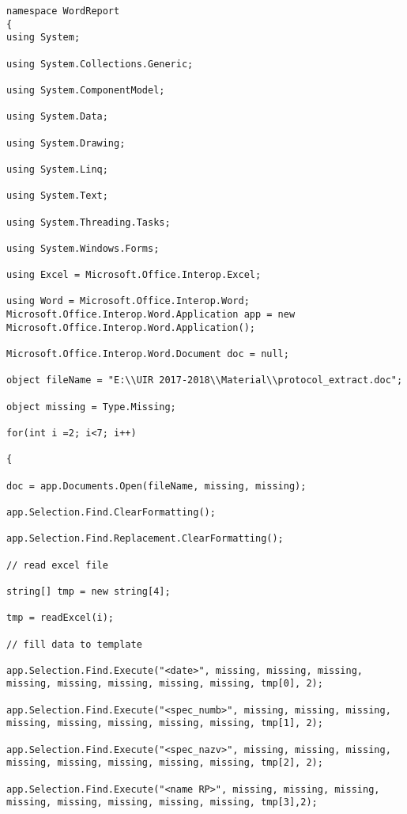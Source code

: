 \begin{lstlisting}
namespace WordReport
{
using System;

using System.Collections.Generic;

using System.ComponentModel;

using System.Data;

using System.Drawing;

using System.Linq;

using System.Text;

using System.Threading.Tasks;

using System.Windows.Forms;

using Excel = Microsoft.Office.Interop.Excel;

using Word = Microsoft.Office.Interop.Word; 
Microsoft.Office.Interop.Word.Application app = new Microsoft.Office.Interop.Word.Application();

Microsoft.Office.Interop.Word.Document doc = null;

object fileName = "E:\\UIR 2017-2018\\Material\\protocol_extract.doc";

object missing = Type.Missing;

for(int i =2; i<7; i++)

{

doc = app.Documents.Open(fileName, missing, missing);

app.Selection.Find.ClearFormatting();

app.Selection.Find.Replacement.ClearFormatting();

// read excel file

string[] tmp = new string[4];

tmp = readExcel(i);

// fill data to template

app.Selection.Find.Execute("<date>", missing, missing, missing, missing, missing, missing, missing, missing, tmp[0], 2);

app.Selection.Find.Execute("<spec_numb>", missing, missing, missing, missing, missing, missing, missing, missing, tmp[1], 2);

app.Selection.Find.Execute("<spec_nazv>", missing, missing, missing, missing, missing, missing, missing, missing, tmp[2], 2);

app.Selection.Find.Execute("<name RP>", missing, missing, missing, missing, missing, missing, missing, missing, tmp[3],2);


\end{lstlisting}
